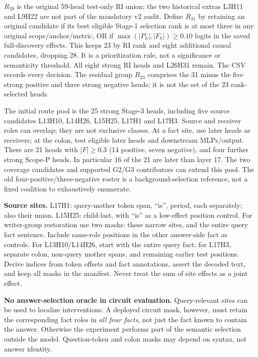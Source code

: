 \documentclass[11pt,a4paper]{article}
\newcommand{\Rtest}{R_{59}}
\begin{document}
$\Rtest$ is the original 59-head test-only RI union; the two historical extras
L3H11 and L9H22 are not part of the mandatory v2 audit. Define $R_{31}$ by retaining
an original candidate if its best eligible Stage-1 selection rank is at most three
in any original scope/anchor/metric, OR if
$\max(|P_h|,|F_h|)\ge0.10$ logits in the saved full-discovery effects.
This keeps 23 by RI rank and eight additional causal candidates, dropping 28.
It is a prioritization rule, not a significance or semanticity threshold.
All eight strong RI heads and L26H31 remain. The CSV records every decision.
The residual group $R_{23}$ comprises the 31 minus the five strong positive and
three strong negative heads; it is not the set of the 23 rank-selected heads.

The initial route pool is the 25 strong Stage-3 heads, including five source
candidates L13H10, L14H26, L15H25, L17H1 and L17H3. Source and receiver roles can
overlap; they are not exclusive classes. At a fact site, use later heads as
receivers; at the colon, test eligible later heads and downstream MLPs/output.
There are 21 heads with $|F|\ge0.3$ (14 positive, seven negative), and four further
strong Scope-P heads. In particular 16 of the 21 are later than layer 17.
The two coverage candidates and supported G2/G3 contributors can extend this pool.
The old four-positive/three-negative roster is a background-selection reference,
not a fixed coalition to exhaustively enumerate.

\textbf{Source sites.} L17H1: query-mother token span, ``is'', period, each separately;
also their union. L15H25: child-last, with ``is'' as a low-effect position control.
For writer-group restoration use two masks: these narrow sites, and the entire query
fact sentence. Include same-role positions in the other answer-side fact as controls.
For L13H10/L14H26, start with the entire query fact; for L17H3, separate colon,
non-query mother spans, and remaining earlier test positions. Derive indices from
token offsets and fact annotations, assert the decoded text, and keep all masks in
the manifest. Never treat the sum of site effects as a joint effect.

\textbf{No answer-selection oracle in circuit evaluation.} Query-relevant sites can
be used to localize interventions. A deployed circuit mask, however, must retain the
corresponding fact roles in \emph{all four facts}, not just the fact known to contain
the answer. Otherwise the experiment performs part of the semantic selection outside
the model. Question-token and colon masks may depend on syntax, not answer identity.
\end{document}
